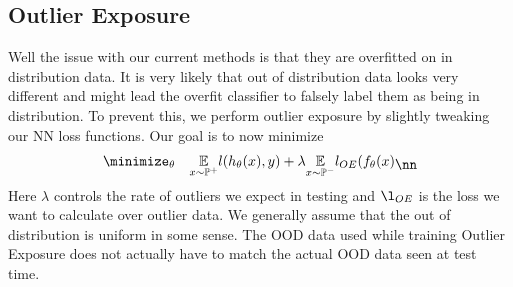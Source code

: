 \documentclass[11pt]{report}
\begin{document}
\subsection{Outlier Exposure \cite{HendrycksMazeikaDietterich2018}}
Well the issue with our current methods is that they are overfitted on in distribution data. It is very likely that out of distribution data looks very different and might lead the overfit classifier to falsely label them as being in distribution. To prevent this, we perform outlier exposure by slightly tweaking our NN loss functions. Our goal is to now minimize
\begin{align}
    \begin{aligned}
            &\minimize_{\theta}  && \underset{x \sim \mathbb{P}^+}{\mathbb{E}} l(h_\theta(x),y) + \lambda  \underset{x \sim \mathbb{P}^-}{\mathbb{E}} l_{OE}(f_\theta(x) \\
        \end{aligned} \nn
\end{align}
Here \(\lambda\) controls the rate of outliers we expect in testing and \(\l_{OE}\) is the loss we want to calculate over outlier data. We generally assume that the out of distribution is uniform in some sense. The OOD data used while training Outlier Exposure does not actually have to match the actual OOD data seen at test time.
\end{document}
